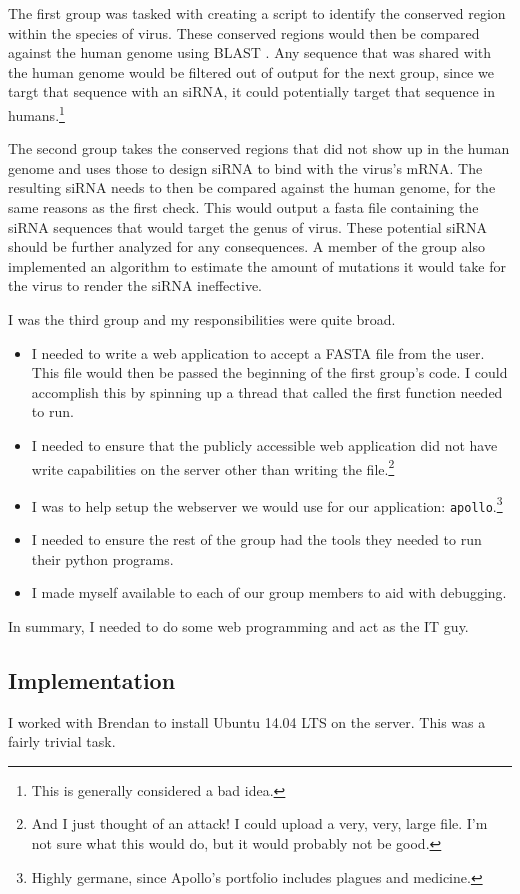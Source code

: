 \documentclass[10pt,letterpaper]{article}
\begin{document}
The first group was tasked with creating a script to identify the conserved region within the species of virus.
These conserved regions would then be compared against the human genome using BLAST \cite{blast}.
Any sequence that was shared with the human genome would be filtered out of output for the next group, since we targt that sequence with an siRNA, it could potentially target that sequence in humans.\footnote{This is generally considered a bad idea.}

The second group takes the conserved regions that did not show up in the human genome and uses those to design siRNA to bind with the virus's mRNA.
The resulting siRNA needs to then be compared against the human genome, for the same reasons as the first check.
This would output a fasta file containing the siRNA sequences that would target the genus of virus.
These potential siRNA should be further analyzed for any consequences.
A member of the group also implemented an algorithm to estimate the amount of mutations it would take for the virus to render the siRNA ineffective.


I was the third group and my responsibilities were quite broad.
\begin{itemize}
	\item I needed to write a web application to accept a FASTA file from the user.
	This file would then be passed the beginning of the first group's code. 
	I could accomplish this by spinning up a thread that called the first function needed to run.
	\item I needed to ensure that the publicly accessible web application did not have write capabilities on the server other than writing the file.\footnote{And I just thought of an attack!  I could upload a very, very, large file.  I'm not sure what this would do, but it would probably not be good.} 
	\item I was to help setup the webserver we would use for our application: \texttt{apollo}.\footnote{Highly germane, since Apollo's portfolio includes plagues and medicine.}
	\item I needed to ensure the rest of the group had the tools they needed to run their python programs.
	\item I made myself available to each of our group members to aid with debugging.
\end{itemize}
In summary, I needed to do some web programming and act as the IT guy.



\subsection{Implementation}
I worked with Brendan to install Ubuntu 14.04 LTS on the server. 
This was a fairly trivial task.
\end{document}
